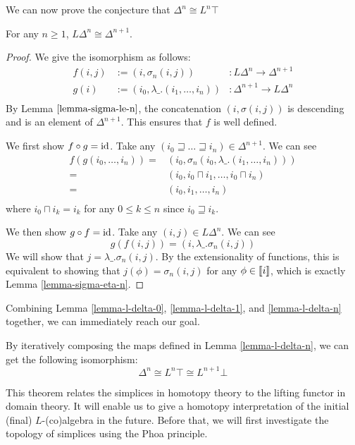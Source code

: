 We can now prove the conjecture that $\Delta^n\cong L^n\top$
\begin{lemma}
    \label{lemma-l-delta-n}
    For any $n\ge1$, $L\Delta^n\cong\Delta^{n+1}$.
\end{lemma}
\begin{proof}
    We give the isomorphism as follows:
    $$\begin{aligned}
        f(i,j)&:=(i,\sigma_n(i,j))&:L\Delta^n\to\Delta^{n+1} \\
        g(i)&:=(i_0,\lambda\_.(i_1,\dots,i_n))&:\Delta^{n+1}\to L\Delta^n \\
    \end{aligned}$$
    By Lemma $\ref{lemma-sigma-le-n}$, the concatenation $(i,\sigma(i,j))$ is descending and is an element of $\Delta^{n+1}$. This ensures that $f$ is well defined.

    We first show $f\circ g=\operatorname{id}$. Take any $(i_0\sqsupseteq\dots\sqsupseteq i_n)\in\Delta^{n+1}$. We can see
    $$\begin{aligned}
        f(g(i_0,\dots,i_n))=&(i_0,\sigma_n(i_0,\lambda\_.(i_1,\dots,i_n))) \\
        =&(i_0,i_0\sqcap i_1,\dots,i_0\sqcap i_n) \\
        =&(i_0,i_1,\dots,i_n) \\
    \end{aligned}$$
    where $i_0\sqcap i_k=i_k$ for any $0\le k\le n$ since $i_0\sqsupseteq i_k$.

    We then show $g\circ f=\operatorname{id}$. Take any $(i,j)\in L\Delta^n$. We can see
    $$g(f(i,j))=(i,\lambda\_.\sigma_n(i,j))$$
    We will show that $j=\lambda\_.\sigma_n(i,j)$. By the extensionality of functions, this is equivalent to showing that $j(\phi)=\sigma_n(i,j)$ for any $\phi\in\left\llbracket i\right\rrbracket$, which is exactly Lemma \ref{lemma-sigma-eta-n}.
\end{proof}
Combining Lemma \ref{lemma-l-delta-0}, \ref{lemma-l-delta-1}, and \ref{lemma-l-delta-n} together, we can immediately reach our goal.
\begin{theorem}
    \label{thm-l-delta}
    By iteratively composing the maps defined in Lemma \ref{lemma-l-delta-n}, we can get the following isomorphism:
    $$\Delta^n\cong L^n\top\cong L^{n+1}\bot$$
\end{theorem}
This theorem relates the simplices in homotopy theory to the lifting functor in domain theory. It will enable us to give a homotopy interpretation of the initial (final) $L$-(co)algebra in the future. Before that, we will first investigate the topology of simplices using the Phoa principle.
